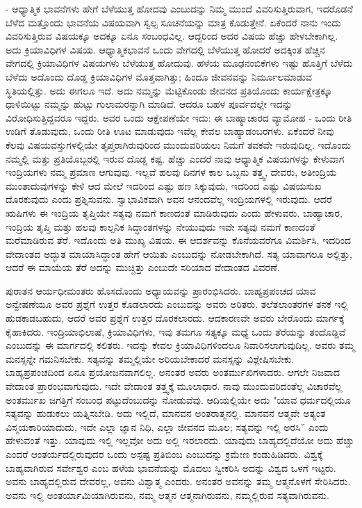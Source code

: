 - ಆಧ್ಯಾತ್ಮಿಕ ಭಾವನೆಗಳು ಹೇಗೆ ಬೆಳೆಯುತ್ತ ಹೋದವು ಎಂಬುದನ್ನು ನಿಮ್ಮ ಮುಂದೆ ವಿವರಿಸುತ್ತಿರುವಾಗ, ಇದರೊಡನೆ ಬೆಳೆದ ಮತ್ತೊಂದು ಭಾವನೆಯ ವಿಷಯವಾಗಿ ಸ್ವಲ್ಪ ಸೂಚನೆಯನ್ನು ಮಾತ್ರ ಕೊಡುತ್ತೇನೆ. ಏಕೆಂದರೆ ನಾನು ಇಂದು ವಿವರಿಸುತ್ತಿರುವ ವಿಷಯಕ್ಕೂ ಅದಕ್ಕೂ ಏನೂ ಸಂಬಂಧವಿಲ್ಲ. ಆದ್ದರಿಂದ ಅದರ ವಿಷಯ ಹೆಚ್ಚು ಹೇಳಬೇಕಾಗಿಲ್ಲ. ಅದು ಕ್ರಿಯಾವಿಧಿಗಳ ವಿಷಯ. ಆಧ್ಯಾತ್ಮಿಕಭಾವನೆ ಒಂದು ವೇಗದಲ್ಲಿ ಬೆಳೆಯುತ್ತ ಹೋದರೆ ಅದಕ್ಕಿಂತ ಹೆಚ್ಚಿನ ವೇಗದಲ್ಲಿ ಕ್ರಿಯಾವಿಧಿಗಳ ವಿಷಯಗಳು ಬೆಳೆಯುತ್ತ ಹೋದುವು. ಹಳೆಯ ಮೂಢನಂಬಿಕೆಗಳು ಇಷ್ಟು ಹೊತ್ತಿಗೆ ಬೆಳೆದು ಬೆಳೆದು ಅದೊಂದು ದೊಡ್ಡ ಕ್ರಿಯಾವಿಧಿಗಳ ಮೊತ್ತವಾಗಿತ್ತು; ಹಿಂದೂ ಜೀವನವನ್ನು ನಿರ್ಮೂಲಮಾಡುವ ಸ್ಥಿತಿಯಲ್ಲಿತ್ತು. ಅದು ಈಗಲೂ ಇದೆ. ಅದು ನಮ್ಮನ್ನು ಮೆಟ್ಟಿಕೊಂಡು ಜೀವನದ ಪ್ರತಿಯೊಂದು ಕಾರ್ಯಕ್ಷೇತ್ರಕ್ಕೂ ಧಾಳಿಯಿಟ್ಟು ನಮ್ಮನ್ನು ಹುಟ್ಟು ಗುಲಾಮರನ್ನಾಗಿ ಮಾಡಿದೆ. ಆದರೂ ಬಹಳ ಪೂರ್ವದಲ್ಲೇ ಇದನ್ನು ವಿರೋಧಿಸುತ್ತಿದ್ದವರೂ ಇದ್ದರು. ಅವರ ಒಂದು ಆಕ್ಷೇಪಣೆಯೇ ಇದು: ಈ ಬಾಹ್ಯಾಚಾರದ ವ್ಯಾಮೋಹ - ಒಂದು ರೀತಿ ಉಡಿಗೆ ತೊಡುವುದು, ಒಂದು ರೀತಿ ಊಟ ಮಾಡುವುದು ಇವೆಲ್ಲ ಕೇವಲ ಬಾಹ್ಯಾಡಂಬರಗಳು. ಏಕೆಂದರೆ ನೀವು ಕೆಲವು ವಿಷಯವಸ್ತುಗಳಲ್ಲಿಯೇ ತೃಪ್ತರಾಗಿರುವುರಿಂದ ಮುಂದುವರಿಯಲು ನಿಮಗೆ ತವಕವೇ ಇರುವುದಿಲ್ಲ. ಇದೊಂದು ನಮ್ಮಲ್ಲಿ ಮತ್ತು ಪ್ರತಿಯೊಬ್ಬರಲ್ಲಿ ಇರುವ ದೊಡ್ಡ ಕಷ್ಟ. ಹೆಚ್ಚು ಎಂದರೆ ನಾವು ಆಧ್ಯಾತ್ಮಿಕ ವಿಷಯಗಳನ್ನು ಕೇಳುವಾಗ ಇಂದ್ರಿಯಗಳು ನಮ್ಮ ಪ್ರಮಾಣ ಆಗುವುವು. ಇಲ್ಲವೆ ಹಲವು ದಿನಗಳ ಕಾಲ ಒಬ್ಬನು ತತ್ತ್ವ, ದೇವರು, ಅತೀಂದ್ರಿಯ ಮುಂತಾದುವುಗಳನ್ನು ಕೇಳಿ ಆದ ಮೇಲೆ ಇದರಿಂದ ಎಷ್ಟು ಹಣ ಸಿಕ್ಕುವುದು, ಇದರಿಂದ ಎಷ್ಟು ವಿಷಯಸುಖ ದೊರಕುವುದು ಎಂದು ಪ್ರಶ್ನಿಸುವನು. ಸ್ವಾಭಾವಿಕವಾಗಿ ಅವನ ಆನಂದವೆಲ್ಲ ಇಂದ್ರಿಯಗಳಲ್ಲಿ ಇರುವುದು. ಆದರೆ ಋಷಿಗಳು ಈ ಇಂದ್ರಿಯ ತೃಪ್ತಿಯೇ ಸತ್ಯವು ನಮಗೆ ಕಾಣದಂತೆ ಮಾಡಿರುವುದು ಎಂದು ಹೇಳುವರು. ಬಾಹ್ಯಾಚಾರ, ಇಂದ್ರಿಯ ತೃಪ್ತಿ ಮತ್ತು ಹಲವು ಕಾಲ್ಪನಿಕ ಸಿದ್ಧಾಂತಗಳನ್ನು ನೇಯುವುದು ಇವೇ ಸತ್ಯವು ನಮಗೆ ಕಾಣದಂತೆ ಮರೆಮಾಡಿರುವ ತೆರೆ. ಇದೊಂದು ಅತಿ ಮುಖ್ಯ ವಿಷಯ. ಈ ಆದರ್ಶವನ್ನು ಕೊನೆಯವರೆಗೂ ವಿಮರ್ಶಿಸಿ, ಇದರಿಂದ ವೇದಾಂತದ ಅದ್ಭುತ ಮಾಯಾಸಿದ್ಧಾಂತ ಹೇಗೆ ಆಯಿತು ಎಂಬುದನ್ನು ನೋಡಬೇಕಾಗಿದೆ. ಸತ್ಯ ಯಾವಾಗಲೂ ಅಲ್ಲಿತ್ತು, ಆದರೆ ಈ ಮಾಯೆಯ ತೆರೆ ಅದನ್ನು ಮುಚ್ಚಿತ್ತು ಎಂಬುದೇ ಸರಿಯಾದ ವೇದಾಂತದ ವಿವರಣೆ.

ಪುರಾತನ ಆರ್ಯಧೀಮಂತರು ಹೊಸದೊಂದು ಅಧ್ಯಾಯವನ್ನು ಪ್ರಾರಂಭಿಸಿದರು. ಬಾಹ್ಯಪ್ರಪಂಚದ ಯಾವ ಅನ್ವೇಷಣೆಯೂ ಅವರ ಪ್ರಶ್ನೆಗೆ ಉತ್ತರ ಕೊಡಲಾರದು ಎಂಬುದನ್ನು ಅವರು ಅರಿತರು. ತಲೆತಲಾಂತರಗಳ ತನಕ ಇಲ್ಲಿ ಹುಡಕಾಡಬಹುದು, ಆದರೆ ಅವರ ಪ್ರಶ್ನೆಗೆ ಉತ್ತರ ದೊರಕಲಾರದು. ಆದಕಾರಣವೇ ಅವರು ಬೇರೊಂದು ಮಾರ್ಗಕ್ಕೆ ಕೈಹಾಕಿದರು. ಇಂದ್ರಿಯಾಭಿಲಾಷೆ, ಕ್ರಿಯಾವಿಧಿಗಳು, ಇವು ತಮಗೂ ಸತ್ಯಕ್ಕೂ ಮಧ್ಯೆ ಒಂದು ತೆರೆಯನ್ನು ತಂದೊಡ್ಡಿವೆ ಎಂಬುದನ್ನು ಈ ಮಾರ್ಗದಲ್ಲಿ ಕಲಿತರು. ಇದನ್ನು ಕೇವಲ ಕ್ರಿಯಾವಿಧಿಗಳಿಂದಲೂ ನಿವಾರಿಸಲಾಗುವುದಿಲ್ಲ. ಅವರು ತಮ್ಮ ಮನಸ್ಸನ್ನೇ ಗಮನಿಸಬೇಕು. ಸತ್ಯವನ್ನು ತಮ್ಮಲ್ಲಿಯೇ ಅರಿಯಬೇಕಾದರೆ ಮನಸ್ಸನ್ನು ವಿಶ್ಲೇಷಿಸಬೇಕು. ಬಾಹ್ಯಪ್ರಪಂಚದಿಂದ ಏನೂ ಪ್ರಯೋಜನವಾಗಲಿಲ್ಲ. ಅನಂತರ ಅವರು ಅಂತರ್ಮುಖಿಗಳಾದರು. ಆಗಲೇ ನಿಜವಾದ ವೇದಾಂತ ಪ್ರಾರಂಭವಾಗುವುದು. ಇದೇ ವೇದಾಂತ ತತ್ತ್ವಕ್ಕೆ ಮೂಲಾಧಾರ. ನಾವು ಮುಂದುವರಿದಂತೆಲ್ಲ ವಿಚಾರವೆಲ್ಲ ಅಂತರ್ಮುಖ ಜಗತ್ತಿಗೆ ಸಂಬಂಧ ಪಟ್ಟುದೆಂಬುದನ್ನು ನೋಡುವೆವು. ಆದಿಯಲ್ಲಿಯೇ ಅದು "ಯಾವ ಧರ್ಮದಲ್ಲಿಯೂ ಸತ್ಯವನ್ನು ಹುಡುಕಲು ಯತ್ನಿಸಬೇಡಿ. ಅದು ಇಲ್ಲಿದೆ, ಮಾನವನ ಅಂತರಾತ್ಮನಲ್ಲಿ. ಮಾನವನ ಆತ್ಮವೇ ಅತ್ಯಂತ ವಿಸ್ಮಯಕಾರಿಯಾದುದು, ಇದೇ ಎಲ್ಲಾ ಜ್ಞಾನ ನಿಧಿ, ಎಲ್ಲಾ ಜೀವನದ ಮೂಲ; ಸತ್ಯವನ್ನು ಇಲ್ಲಿ ಅರಸಿ'' ಎಂದು ಹೇಳುವಂತೆ ಇತ್ತು. ಯಾವುದು ಇಲ್ಲಿ ಇಲ್ಲವೋ ಅದು ಅಲ್ಲಿ ಇರಲಾರದು. ಯಾವುದು ಬಾಹ್ಯದಲ್ಲಿದೆಯೋ ಅದು ಹೆಚ್ಚು ಎಂದರೆ ಆಂತರ್ಯದಲ್ಲಿರುವುದರ ಒಂದು ಅಸ್ಪಷ್ಟ ಪ್ರತಿಬಿಂಬ ಎಂಬುದನ್ನು ಕ್ರಮೇಣ ಕಂಡುಹಿಡಿದರು. ವಿಶ್ವಕ್ಕೆ ಬಾಹ್ಯವಾಗಿರುವ ಸರ್ವೇಶ್ವರ ಎಂಬ ಹಳೆಯ ಭಾವನೆಯನ್ನು ಮೊದಲು ಸ್ವೀಕರಿಸಿ ಅದನ್ನು ವಿಶ್ವದ ಒಳಗೆ ಇಟ್ಟರು. ಅವನು ಬಾಹ್ಯದಲ್ಲಿರುವ ದೇವರಲ್ಲ, ಅವನು ವಿಶ್ವಾತ್ಮ ಎಂದರು. ಅನಂತರ ಅವನನ್ನು ತಮ್ಮ ಆತ್ಮನೊಳಗೆ ಸೇರಿಸಿದರು. ಅವನು ಇಲ್ಲಿ ಅಂತರ್ಯಾಮಿಯಾಗಿರುವನು, ನಮ್ಮ ಆತ್ಮನ ಆತ್ಮನಾಗಿರುವನು, ನಮ್ಮಲ್ಲಿರುವ ಸತ್ಯವಾಗಿರುವನು.


